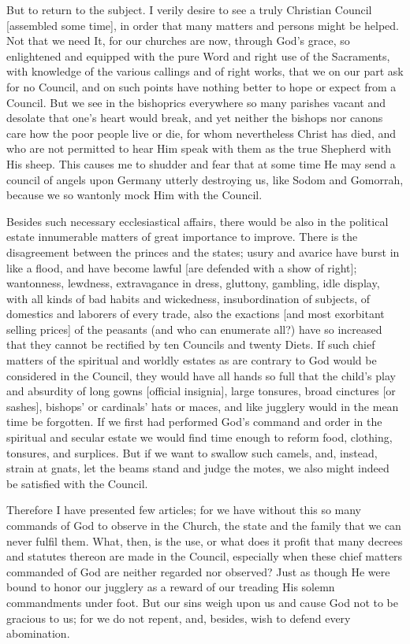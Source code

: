 But to return to the subject. I verily desire to see a truly
Christian Council [assembled some time], in order that many
matters and persons might be helped. Not that we need It, for
our churches are now, through God's grace, so enlightened and
equipped with the pure Word and right use of the Sacraments,
with knowledge of the various callings and of right works,
that we on our part ask for no Council, and on such points
have nothing better to hope or expect from a Council. But we
see in the bishoprics everywhere so many parishes vacant and
desolate that one's heart would break, and yet neither the
bishops nor canons care how the poor people live or die, for
whom nevertheless Christ has died, and who are not permitted
to hear Him speak with them as the true Shepherd with His
sheep. This causes me to shudder and fear that at some time He
may send a council of angels upon Germany utterly destroying
us, like Sodom and Gomorrah, because we so wantonly mock Him
with the Council.

Besides such necessary ecclesiastical affairs, there would be
also in the political estate innumerable matters of great
importance to improve. There is the disagreement between the
princes and the states; usury and avarice have burst in like a
flood, and have become lawful [are defended with a show of
right]; wantonness, lewdness, extravagance in dress, gluttony,
gambling, idle display, with all kinds of bad habits and
wickedness, insubordination of subjects, of domestics and
laborers of every trade, also the exactions [and most
exorbitant selling prices] of the peasants (and who can
enumerate all?) have so increased that they cannot be
rectified by ten Councils and twenty Diets. If such chief
matters of the spiritual and worldly estates as are contrary
to God would be considered in the Council, they would have all
hands so full that the child's play and absurdity of long
gowns [official insignia], large tonsures, broad cinctures [or
sashes], bishops' or cardinals' hats or maces, and like
jugglery would in the mean time be forgotten. If we first had
performed God's command and order in the spiritual and secular
estate we would find time enough to reform food, clothing,
tonsures, and surplices. But if we want to swallow such
camels, and, instead, strain at gnats, let the beams stand and
judge the motes, we also might indeed be satisfied with the
Council.

Therefore I have presented few articles; for we have without
this so many commands of God to observe in the Church, the
state and the family that we can never fulfil them. What,
then, is the use, or what does it profit that many decrees and
statutes thereon are made in the Council, especially when
these chief matters commanded of God are neither regarded nor
observed? Just as though He were bound to honor our jugglery
as a reward of our treading His solemn commandments under
foot. But our sins weigh upon us and cause God not to be
gracious to us; for we do not repent, and, besides, wish to
defend every abomination.

